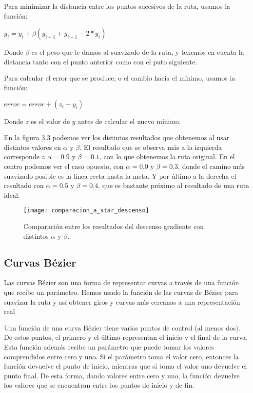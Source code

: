 Para minimizar la distancia entre los puntos sucesivos de la ruta, usamos la función:
\begin{center}
$y_i = y_i + \beta (y_{i+1} + y_{i-1} - 2 * y_i)$
\end{center}
Donde $\beta$ es el peso que le damos al suavizado de la ruta, y tenemos en cuenta la distancia tanto con el punto anterior como con el puto siguiente.

Para calcular el error que se produce, o el cambio hacia el mínimo, usamos la función:
\begin{center}
$error = error + (z_i - y_i)$
\end{center}
Donde $z$ es el valor de $y$ antes de calcular el nuevo mínimo.

En la figura 3.3 podemos ver los distintos resultados que obtenemos al usar distintos valores en $\alpha$ y $\beta$. El resultado que se observa más a la izquierda corresponde a $\alpha = 0.9$ y $\beta = 0.1$, con lo que obtenemos la ruta original. En el centro podemos ver el caso opuesto, con $\alpha = 0.0$ y $\beta = 0.3$, donde el camino más suavizado posible es la línea recta hasta la meta. Y por último a la derecha el resultado con $\alpha = 0.5$ y $\beta = 0.4$, que es bastante próximo al resultado de una ruta ideal.
\begin{figure}[!htpb]
    \centering
    \texttt{[image: comparacion\_a\_star\_descenso]}
    \caption[Comparación entre los resultados del descenso gradiente con distintos $\alpha$ y $\beta$]{Comparación entre los resultados del descenso gradiente con distintos $\alpha$ y $\beta$.}
    \label{fig:basics AFM sketch}
\end{figure}

\subsection{Curvas Bézier}
Las curvas Bézier \cite{bezierdevmag, wiki:bezier} son una forma de representar curvas a través de una función que recibe un parámetro. Hemos usado la función de las curvas de Bézier para suavizar la ruta y así obtener giros y curvas más cercanas a una representación real

Una función de una curva Bézier tiene varios puntos de control (al menos dos). De estos puntos, el primero y el último representan el inicio y el final de la curva. Esta función además recibe un parámetro que puede tomar los valores comprendidos entre cero y uno. Si el parámetro toma el valor cero, entonces la función devuelve el punto de inicio, mientras que si toma el valor uno devuelve el punto final. De esta forma, dando valores entre cero y uno, la función devuelve los valores que se encuentran entre los puntos de inicio y de fin.

